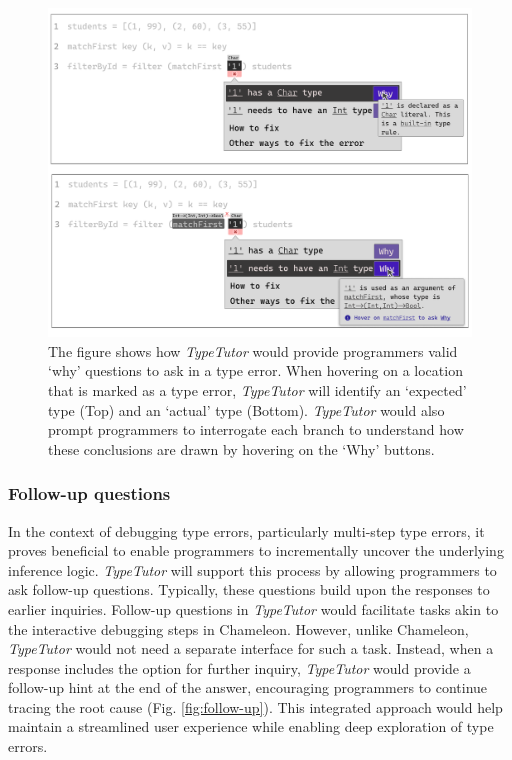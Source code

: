 \begin{figure}[hbt]
  \includegraphics[width=\linewidth]{Why}
  \caption[An example of \textit{TypeTutor} providing explanation (`why' questions)]{
      \label{fig:why}
      The figure shows how \textit{TypeTutor} would provide programmers valid `why' questions to ask in a type error. When hovering on a location that is marked as a type error, \textit{TypeTutor} will identify an `expected' type (Top) and an `actual' type (Bottom). \textit{TypeTutor} would also prompt programmers to interrogate each branch to understand how these conclusions are drawn by hovering on the `Why' buttons. 
    }
\end{figure}



\subsubsection{Follow-up questions}

In the context of debugging type errors, particularly multi-step type errors, it proves beneficial to enable programmers to incrementally uncover the underlying inference logic. \textit{TypeTutor} will support this process by allowing programmers to ask follow-up questions. Typically, these questions build upon the responses to earlier inquiries. Follow-up questions in \textit{TypeTutor} would facilitate tasks akin to the interactive debugging steps in Chameleon. However, unlike Chameleon, \textit{TypeTutor} would not need a separate interface for such a task. Instead, when a response includes the option for further inquiry, \textit{TypeTutor} would provide a follow-up hint at the end of the answer, encouraging programmers to continue tracing the root cause (Fig. \ref{fig:follow-up}). This integrated approach would help maintain a streamlined user experience while enabling deep exploration of type errors.


